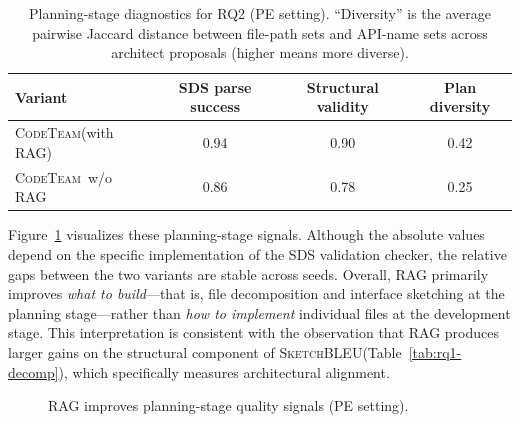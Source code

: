 \documentclass[format=acmsmall, review=false, screen=true]{acmart}
\newcommand{\tool}{\textsc{CodeTeam}\xspace}
\newcommand{\sketchbleu}{\textsc{SketchBLEU}\xspace}
\begin{document}
\begin{table}[t]
\centering
\small
\caption{Planning-stage diagnostics for RQ2 (PE setting). ``Diversity'' is the average pairwise Jaccard distance between file-path sets and API-name sets across architect proposals (higher means more diverse).}
\label{tab:rq2-plan}
\begin{tabular}{@{}lccc@{}}
\toprule
Variant & SDS parse success & Structural validity & Plan diversity \\
\midrule
\tool (with RAG) & 0.94 & 0.90 & 0.42 \\
\tool\ w/o RAG & 0.86 & 0.78 & 0.25 \\
\bottomrule
\end{tabular}
\end{table}

Figure~\ref{fig:rq2-planbars} visualizes these planning-stage signals.
Although the absolute values depend on the specific implementation of the SDS validation checker, the relative gaps between the two variants are stable across seeds.
Overall, RAG primarily improves \emph{what to build}---that is, file decomposition and interface sketching at the planning stage---rather than \emph{how to implement} individual files at the development stage. This interpretation is consistent with the observation that RAG produces larger gains on the structural component of \sketchbleu (Table~\ref{tab:rq1-decomp}), which specifically measures architectural alignment.

\begin{figure}[t]
\centering
{}
\caption{RAG improves planning-stage quality signals (PE setting).}
\label{fig:rq2-planbars}
\end{figure}
\end{document}
